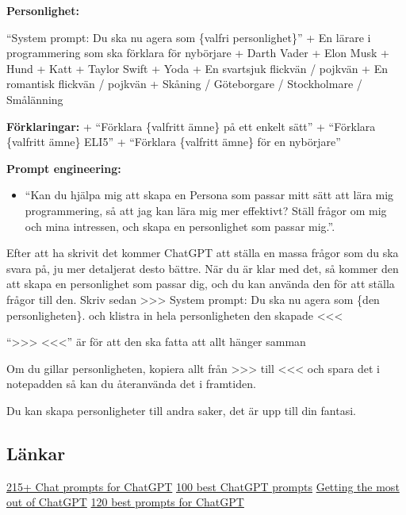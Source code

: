 \textbf{Personlighet:}

``System prompt: Du ska nu agera som \{valfri personlighet\}'' + En
lärare i programmering som ska förklara för nybörjare + Darth Vader +
Elon Musk + Hund + Katt + Taylor Swift + Yoda + En svartsjuk flickvän /
pojkvän + En romantisk flickvän / pojkvän + Skåning / Göteborgare /
Stockholmare / Smålänning

\textbf{Förklaringar:} + ``Förklara \{valfritt ämne\} på ett enkelt
sätt'' + ``Förklara \{valfritt ämne\} ELI5'' + ``Förklara \{valfritt
ämne\} för en nybörjare''

\textbf{Prompt engineering:}

\begin{itemize}
\tightlist
\item
  ``Kan du hjälpa mig att skapa en Persona som passar mitt sätt att lära
  mig programmering, så att jag kan lära mig mer effektivt? Ställ frågor
  om mig och mina intressen, och skapa en personlighet som passar
  mig.''.
\end{itemize}

Efter att ha skrivit det kommer ChatGPT att ställa en massa frågor som
du ska svara på, ju mer detaljerat desto bättre. När du är klar med det,
så kommer den att skapa en personlighet som passar dig, och du kan
använda den för att ställa frågor till den. Skriv sedan
\textgreater\textgreater\textgreater{} System prompt: Du ska nu agera
som \{den personligheten\}. och klistra in hela personligheten den
skapade \textless\textless\textless{}

``\textgreater\textgreater\textgreater{} \textless\textless\textless''
är för att den ska fatta att allt hänger samman

Om du gillar personligheten, kopiera allt från
\textgreater\textgreater\textgreater{} till
\textless\textless\textless{} och spara det i notepadden så kan du
återanvända det i framtiden.

Du kan skapa personligheter till andra saker, det är upp till din
fantasi.

\hypertarget{luxe4nkar}{%
\subsection{Länkar}\label{luxe4nkar}}

\href{https://writesonic.com/blog/chatgpt-prompts/\#best-chatgpt-prompts-for-education}{215+
Chat prompts for ChatGPT}
\href{https://mpost.io/100-best-chatgpt-prompts-to-unleash-ais-potential/}{100
best ChatGPT prompts}
\href{https://www.euronews.com/next/2023/06/25/getting-the-most-out-of-chatgpt-these-are-the-most-useful-prompts-to-try-now}{Getting
the most out of ChatGPT}
\href{https://www.greataiprompts.com/chat-gpt/best-chat-gpt-prompts/}{120
best prompts for ChatGPT}

